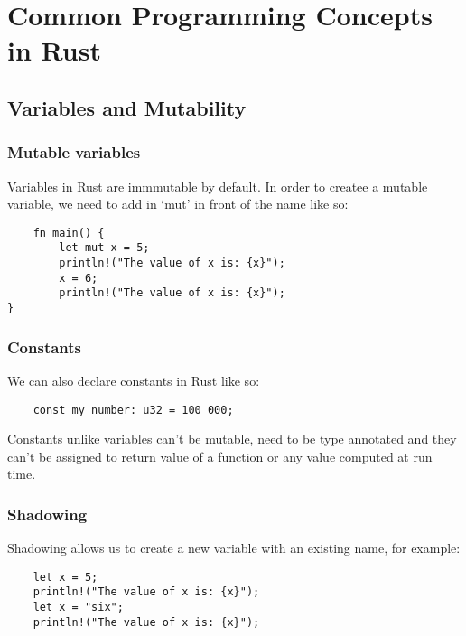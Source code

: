 \section{Common Programming Concepts in Rust}
\subsection{Variables and Mutability}
\subsubsection{Mutable variables} 
Variables in Rust are immmutable by default. In order to createe a mutable variable, we need to add in `mut' in front of the name like so:
\begin{lstlisting}
    fn main() {
        let mut x = 5;
        println!("The value of x is: {x}");
        x = 6;
        println!("The value of x is: {x}"); 
}
\end{lstlisting}


\subsubsection{Constants} We can also declare constants in Rust like so:
\begin{lstlisting}
    const my_number: u32 = 100_000;
\end{lstlisting}

Constants unlike variables can't be mutable, need to be type annotated and they can't be assigned to return value of a function or any value computed at run time.

\subsubsection{Shadowing}
Shadowing allows us to create a new variable with an existing name, for example:
\begin{lstlisting}
    let x = 5;
    println!("The value of x is: {x}");
    let x = "six";
    println!("The value of x is: {x}");
\end{lstlisting}

